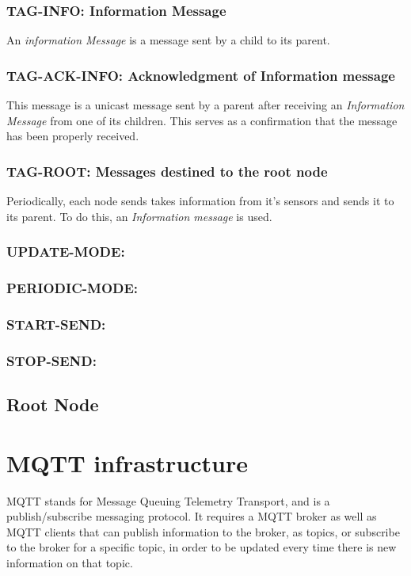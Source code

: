 \documentclass[a4paper,11pt]{article}
\begin{document}
\subsubsection{TAG-INFO: Information Message}
An \textit{information Message} is a message sent by a child to its parent.

\subsubsection{TAG-ACK-INFO: Acknowledgment of Information message}
This message is a unicast message sent by a parent after receiving an \textit{Information Message} from one of its children. This serves as a confirmation that the message has been properly received.


\subsubsection{TAG-ROOT: Messages destined to the root node}
Periodically, each node sends takes information from it's sensors and sends it to its parent. To do this, an \textit{Information message} is used.


\subsubsection{UPDATE-MODE: }
\subsubsection{PERIODIC-MODE: }
\subsubsection{START-SEND:}
\subsubsection{STOP-SEND:}


\subsection{Root Node}


\section{MQTT infrastructure}
MQTT stands for Message Queuing Telemetry Transport, and is a publish/subscribe messaging protocol. It requires a MQTT broker as well as MQTT clients that can publish information to the broker, as topics, or subscribe to the broker for a specific topic, in order to be updated every time there is new information on that topic.
\end{document}
